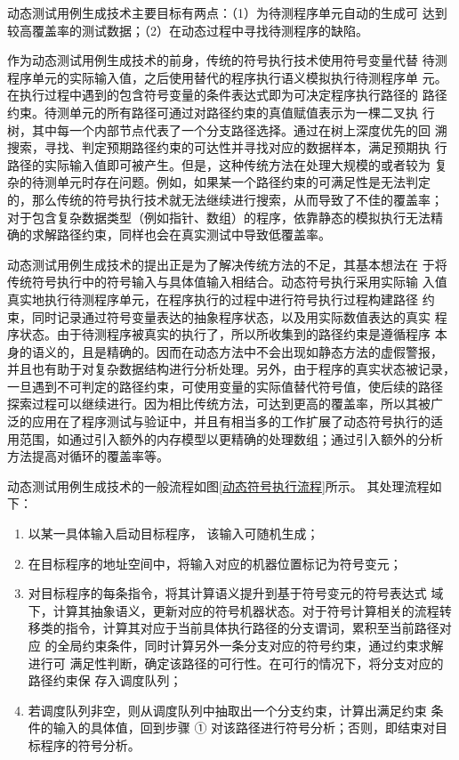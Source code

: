 动态测试用例生成技术主要目标有两点：（1）为待测程序单元自动的生成可
达到较高覆盖率的测试数据；（2）在动态过程中寻找待测程序的缺陷。

作为动态测试用例生成技术的前身，传统的符号执行技术使用符号变量代替
待测程序单元的实际输入值，之后使用替代的程序执行语义模拟执行待测程序单
元。在执行过程中遇到的包含符号变量的条件表达式即为可决定程序执行路径的
路径约束。待测单元的所有路径可通过对路径约束的真值赋值表示为一棵二叉执
行树，其中每一个内部节点代表了一个分支路径选择。通过在树上深度优先的回
溯搜索，寻找、判定预期路径约束的可达性并寻找对应的数据样本，满足预期执
行路径的实际输入值即可被产生。但是，这种传统方法在处理大规模的或者较为
复杂的待测单元时存在问题。例如，如果某一个路径约束的可满足性是无法判定
的，那么传统的符号执行技术就无法继续进行搜索，从而导致了不佳的覆盖率；
对于包含复杂数据类型（例如指针、数组）的程序，依靠静态的模拟执行无法精
确的求解路径约束，同样也会在真实测试中导致低覆盖率。

动态测试用例生成技术的提出正是为了解决传统方法的不足，其基本想法在
于将传统符号执行中的符号输入与具体值输入相结合。动态符号执行采用实际输
入值真实地执行待测程序单元，在程序执行的过程中进行符号执行过程构建路径
约束，同时记录通过符号变量表达的抽象程序状态，以及用实际数值表达的真实
程序状态。由于待测程序被真实的执行了，所以所收集到的路径约束是遵循程序
本身的语义的，且是精确的。因而在动态方法中不会出现如静态方法的虚假警报，
并且也有助于对复杂数据结构进行分析处理。另外，由于程序的真实状态被记录，
一旦遇到不可判定的路径约束，可使用变量的实际值替代符号值，使后续的路径
探索过程可以继续进行。因为相比传统方法，可达到更高的覆盖率，所以其被广
泛的应用在了程序测试与验证中，并且有相当多的工作扩展了动态符号执行的适
用范围，如通过引入额外的内存模型以更精确的处理数组；通过引入额外的分析
方法提高对循环的覆盖率等。

动态测试用例生成技术的一般流程如图\ref{动态符号执行流程}所示。 其处理流程如下：
\begin{enumerate}[(1)]
\item 以某一具体输入启动目标程序， 该输入可随机生成；
\item 在目标程序的地址空间中，将输入对应的机器位置标记为符号变元；
\item 对目标程序的每条指令，将其计算语义提升到基于符号变元的符号表达式
域下，计算其抽象语义，更新对应的符号机器状态。对于符号计算相关的流程转
移类的指令，计算其对应于当前具体执行路径的分支谓词，累积至当前路径对应
的全局约束条件，同时计算另外一条分支对应的符号约束，通过约束求解进行可
满足性判断，确定该路径的可行性。在可行的情况下，将分支对应的路径约束保
存入调度队列；
\item 若调度队列非空，则从调度队列中抽取出一个分支约束，计算出满足约束
条件的输入的具体值，回到步骤 ① 对该路径进行符号分析；否则，即结束对目
标程序的符号分析。
\end{enumerate}

